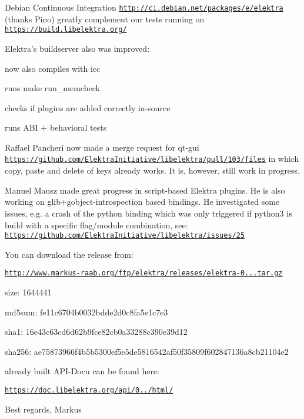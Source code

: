 Debian Continuous Integration \href{http://ci.debian.net/packages/e/elektra}{\tt http\+://ci.\+debian.\+net/packages/e/elektra} (thanks Pino) greatly complement our tests running on \href{https://build.libelektra.org/}{\tt https\+://build.\+libelektra.\+org/}

Elektra’s buildserver also was improved\+:


\begin{DoxyItemize}
\item now also compiles with icc
\item runs {\ttfamily make run\+\_\+memcheck}
\item checks if plugins are added correctly in-\/source
\item runs A\+BI + behavioral tests
\end{DoxyItemize}

Raffael Pancheri now made a merge request for qt-\/gui \href{https://github.com/ElektraInitiative/libelektra/pull/103/files}{\tt https\+://github.\+com/\+Elektra\+Initiative/libelektra/pull/103/files} in which copy, paste and delete of keys already works. It is, however, still work in progress.

Manuel Mausz made great progress in script-\/based Elektra plugins. He is also working on glib+gobject-\/introspection based bindings. He investigated some issues, e.\+g. a crash of the python binding which was only triggered if python3 is build with a specific flag/module combination, see\+: \href{https://github.com/ElektraInitiative/libelektra/issues/25}{\tt https\+://github.\+com/\+Elektra\+Initiative/libelektra/issues/25}

You can download the release from\+:

\href{http://www.markus-raab.org/ftp/elektra/releases/elektra-0.8.8.tar.gz}{\tt http\+://www.\+markus-\/raab.\+org/ftp/elektra/releases/elektra-\/0...\+tar.\+gz}


\begin{DoxyItemize}
\item size\+: 1644441
\item md5sum\+: fe11c6704b0032bdde2d0c8fa5e1c7e3
\item sha1\+: 16e43c63cd6d62b9fce82cb0a33288c390e39d12
\item sha256\+: ae75873966f4b5b5300ef5e5de5816542af50f35809f602847136a8cb21104e2
\end{DoxyItemize}

already built A\+P\+I-\/\+Docu can be found here\+:

\href{https://doc.libelektra.org/api/0.8.8/html/}{\tt https\+://doc.\+libelektra.\+org/api/0../html/}

Best regards, Markus 